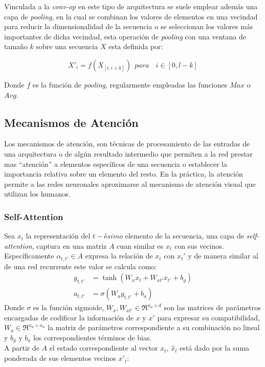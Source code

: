 	Vinculada a la \textit{conv-op} en este tipo de arquitectura se suele emplear además una capa de \textit{pooling}, en la cual se combinan los valores de elementos en una vecindad para reducir la dimensionalidad de la secuencia o se seleccionan los valores más importantes de dicha vecindad, esta operación de \textit{pooling} con una ventana de tamaño $k$  sobre una secuencia $X$ esta definida por:

	\begin{equation}
		X'_i = f(X_{[i:i+k]}) ~~ para ~~~  \;i \in [0, l-k]
	\end{equation}

	Donde $f$ es la función de \textit{pooling}, regularmente empleadas las funciones $Max$ o $Avg$.
		
\subsection{Mecanismos de Atención}

	Los mecanismos de atención, son técnicas de procesamiento de las entradas de una arquitectura o de algún resultado intermedio que permiten a la red prestar mas ``atención'' a elementos específicos de una secuencia o establecer la importancia relativa sobre un elemento del resto. En la práctica, la atención permite a las redes neuronales aproximarse al mecanismo de atención visual que utilizan los humanos.

	\subsubsection{Self-Attention}
	
		Sea $x_t$ la representación del $t-ésimo$ elemento de la secuencia, una capa de \textit{self-attention}, captura en una matriz $A$ cuan similar es $x_t$ con sus vecinos. Específicamente $\alpha_{t, t'} \in A$ expresa la relación de $x_t$ con $x_t'$ y de manera similar al de una red recurrente este valor se calcula como:
		\begin{equation}
			\begin{split}
				g_{t, t'} &= \tanh(W_{x}x_t + W_{x{t'}}x_{t'} + b_g)\\
				a_{t, t'} &= \sigma({W_{a}g_{t, t'} + b_{a}}) 
			\end{split}
		\end{equation}
		Donde $\sigma$ es la función sigmoide, $W_{x}, W_{x{t'}} \in \Re^{n_u \times d} $ son las matrices de parámetros encargadas de codificar la información de $x \text{ y } x'$ para expresar su compatibilidad, $W_a \in \Re^{n_u \times n_u}$ la matriz de parámetros correspondiente a su combinación no lineal y $b_g \text{ y } b_a$ los correspondientes términos de bias.
		\\
		A partir de $A$ el estado correspondiente al vector $x_t$, $\hat{x}_t$ está dado por la suma ponderada de sus elementos vecinos $x'_t$:
		
